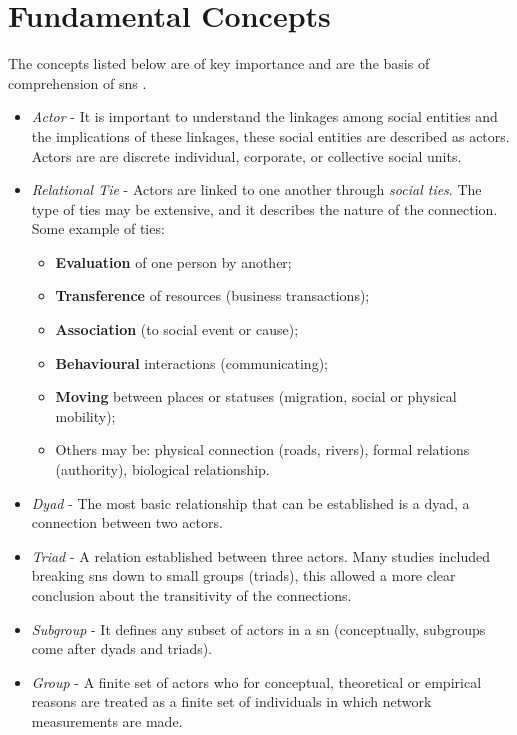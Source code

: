 \section{Fundamental Concepts}

The concepts listed below are of key importance and are the basis of comprehension of \glspl{sn} \citep{wasserman1994social}.

\begin{itemize}
    \item \emph{Actor} - It is important to understand the linkages among social entities and the implications of these linkages, these social entities are described as actors. Actors are are discrete individual, corporate, or collective social units.
    \item \emph{Relational Tie} - Actors are linked to one another through \textit{social ties}. The type of ties may be extensive, and it describes the nature of the connection. Some example of ties:
        \begin{itemize}
            \item \textbf{Evaluation} of one person by another;
            \item \textbf{Transference} of resources (business transactions);
            \item \textbf{Association} (to social event or cause);
            \item \textbf{Behavioural} interactions (communicating);
            \item \textbf{Moving} between places or statuses (migration, social or physical mobility);
            \item Others may be: physical connection (roads, rivers), formal relations (authority), biological relationship.
        \end{itemize}
    \item \emph{Dyad} - The most basic relationship that can be established is a dyad, a connection between two actors.
    \item \emph{Triad} - A relation established between three actors. Many studies included breaking \glspl{sn} down to small groups (triads), this allowed a more clear conclusion about the transitivity of the connections.
    \item \emph{Subgroup} - It defines any subset of actors in a \gls{sn} (conceptually, subgroups come after dyads and triads).
    \item \emph{Group} - A finite set of actors who for conceptual, theoretical or empirical reasons are treated as a finite set of individuals in which network measurements are made.

\end{itemize}
